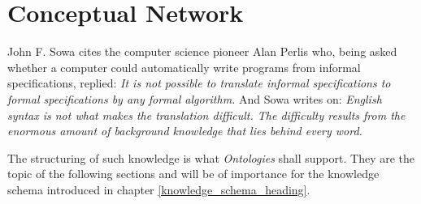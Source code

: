 %
%
%
%
%
%
%

\section{Conceptual Network}
\label{conceptual_network_heading}

John F. Sowa \cite{sowa} cites the computer science pioneer Alan Perlis who,
being asked whether a computer could automatically write programs from informal
specifications, replied: \textit{It is not possible to translate informal
specifications to formal specifications by any formal algorithm.} And Sowa
writes on: \textit{English syntax is not what makes the translation difficult.
The difficulty results from the enormous amount of background knowledge that
lies behind every word.}

The structuring of such knowledge is what \emph{Ontologies} shall support. They
are the topic of the following sections and will be of importance for the
knowledge schema introduced in chapter \ref{knowledge_schema_heading}.








%


